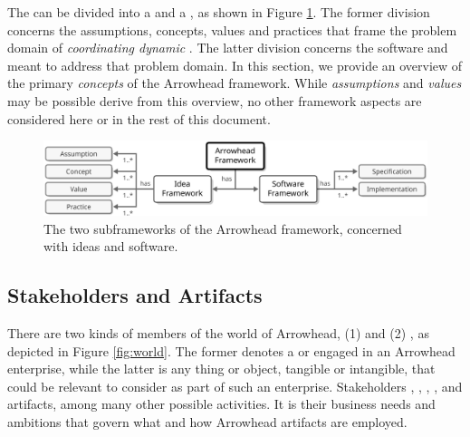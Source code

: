 %
%

The  can be divided into a  and a , as shown in Figure \ref{fig:framework}.
The former division concerns the assumptions, concepts, values and practices that frame the problem domain of \textit{coordinating dynamic }.
The latter division concerns the software  and  meant to address that problem domain.
In this section, we provide an overview of the primary \textit{concepts} of the Arrowhead framework.
While \textit{assumptions} and \textit{values} may be possible derive from this overview, no other framework aspects are considered here or in the rest of this document.

\vfill

\begin{figure}[ht!]
  \centering
  \includegraphics[scale=0.9]{figures/framework}
  \caption{
    The two subframeworks of the Arrowhead framework, concerned with ideas and software.
  }
  \label{fig:framework}
\end{figure}

\vspace*{-3mm}

\subsection{Stakeholders and Artifacts}

There are two kinds of members of the world of Arrowhead, (1)  and (2) , as depicted in Figure \ref{fig:world}.
The former denotes a  or  engaged in an Arrowhead enterprise, while the latter is any thing or object, tangible or intangible, that could be relevant to consider as part of such an enterprise.
Stakeholders , , , , and  artifacts, among many other possible activities.
It is their business needs and ambitions that govern what and how Arrowhead artifacts are employed.

